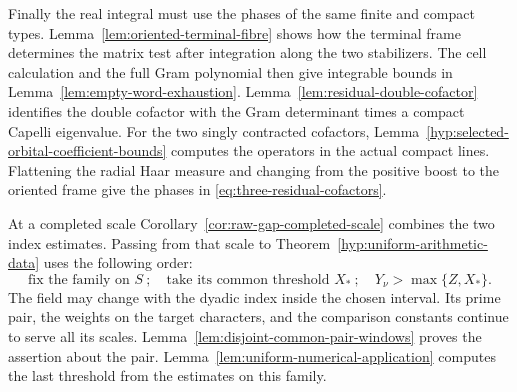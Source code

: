 Finally the real integral must use the phases of the same finite and compact types. Lemma~\ref{lem:oriented-terminal-fibre} shows how the terminal frame determines the matrix test after integration along the two stabilizers. The cell calculation and the full Gram polynomial then give integrable bounds in Lemma~\ref{lem:empty-word-exhaustion}. Lemma~\ref{lem:residual-double-cofactor} identifies the double cofactor with the Gram determinant times a compact Capelli eigenvalue. For the two singly contracted cofactors,
Lemma~\ref{hyp:selected-orbital-coefficient-bounds} computes the
operators in the actual compact lines. Flattening the radial Haar
measure and changing from the positive boost to the oriented frame
give the phases in \eqref{eq:three-residual-cofactors}.

At a completed scale Corollary~\ref{cor:raw-gap-completed-scale}
combines the two index estimates. Passing from that scale to
Theorem~\ref{hyp:uniform-arithmetic-data} uses the following order:
\[
 \text{fix the family on }S\ ;\quad
 \text{take its common threshold }X_*\ ;\quad
 Y_\nu>\max\{Z,X_*\}.
\]
The field may change with the dyadic index inside the chosen
interval. Its prime pair, the weights on the target characters,
and the comparison constants continue to serve all its scales.
Lemma~\ref{lem:disjoint-common-pair-windows} proves the assertion
about the pair. Lemma~\ref{lem:uniform-numerical-application}
computes the last threshold from the estimates on this family.
